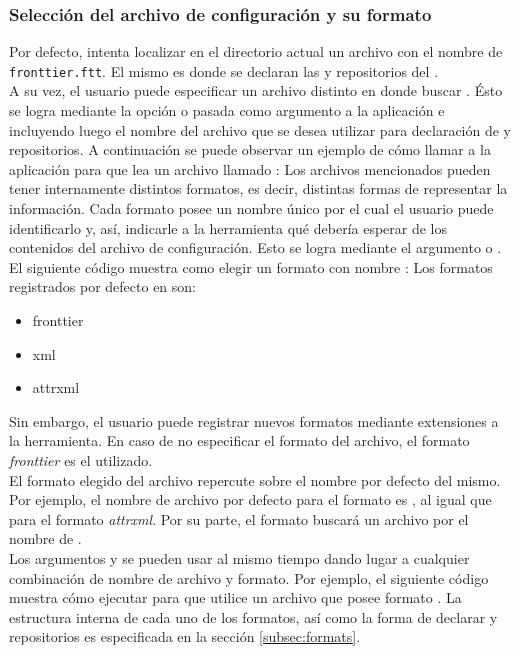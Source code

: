 \subsubsection{Selección del archivo de configuración y su formato}
\label{subsubsec:guide:confformat}

Por defecto, \fronttier intenta localizar en el directorio actual un archivo 
con el nombre de \texttt{fronttier.ftt}. El mismo es donde se declaran las 
\dependencies y repositorios del \project.\\
A su vez, el usuario puede especificar un archivo distinto en donde buscar 
\dependencies. Ésto se logra mediante la opción  o 
 pasada como argumento a la aplicación e incluyendo luego el nombre 
del archivo que se desea utilizar para declaración de \dependencies y 
repositorios. A continuación se puede observar un ejemplo de cómo llamar a la 
aplicación para que lea un archivo llamado :
Los archivos mencionados pueden tener internamente distintos formatos, es 
decir, distintas formas de representar la información. Cada formato posee un 
nombre único por el cual el usuario puede identificarlo y, así, indicarle a la 
herramienta qué debería esperar de los contenidos del archivo de configuración. 
Esto se logra mediante el argumento  o . El 
siguiente código muestra como elegir un formato con nombre :
Los formatos registrados por defecto en \fronttier son:
\begin{itemize}
	\setlength{\itemsep}{1pt}
	\setlength{\parskip}{0pt}
	\setlength{\parsep}{0pt}
	\item fronttier
	\item xml
	\item attrxml
\end{itemize}
Sin embargo, el usuario puede registrar nuevos formatos mediante extensiones
a la herramienta. En caso de no especificar el formato del archivo, el formato 
\emph{fronttier} es el utilizado.\\
El formato elegido del archivo repercute sobre el nombre por defecto del
mismo. Por ejemplo, el nombre de archivo por defecto para el formato 
es , al igual que para el formato \emph{attrxml}. Por su 
parte, el formato  buscará un archivo por el nombre de 
.\\
Los argumentos  y  se pueden usar al mismo
tiempo dando lugar a cualquier combinación de nombre de archivo y formato.
Por ejemplo, el siguiente código muestra cómo ejecutar \fronttier para que 
utilice un archivo  que posee formato .
La estructura interna de cada uno de los formatos, así como la forma de 
declarar \dependencies y repositorios es especificada en la sección 
\ref{subsec:formats}.

